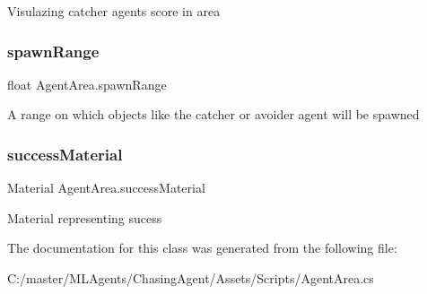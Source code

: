 Visulazing catcher agents score in area 

\mbox{\label{class_agent_area_a382c14ea2bc0912d97d99989db609775}} 
\subsubsection{\texorpdfstring{spawnRange}{spawnRange}}
{\footnotesize\ttfamily float Agent\+Area.\+spawn\+Range}



A range on which objects like the catcher or avoider agent will be spawned 

\mbox{\label{class_agent_area_aded12dd771ca702e85b5f543c5f74b20}} 
\subsubsection{\texorpdfstring{successMaterial}{successMaterial}}
{\footnotesize\ttfamily Material Agent\+Area.\+success\+Material}



Material representing sucess 



The documentation for this class was generated from the following file\+:\begin{DoxyCompactItemize}
\item 
C\+:/master/\+M\+L\+Agents/\+Chasing\+Agent/\+Assets/\+Scripts/Agent\+Area.\+cs\end{DoxyCompactItemize}
